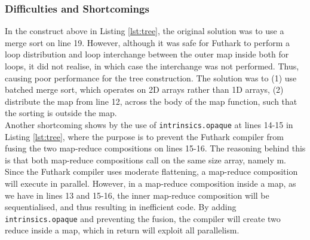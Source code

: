 \subsubsection{Difficulties and Shortcomings}
\label{sec:treediff}
In the construct above in Listing \ref{lst:tree}, the original solution was to use a merge sort on line 19. However, although it was safe for Futhark to perform a loop distribution and loop interchange between the outer map inside both for loops, it did not realise, in which case the interchange was not performed. Thus, causing poor performance for the tree construction.  The solution was to (1) use batched merge sort, which operates on 2D arrays rather than 1D arrays, (2) distribute the map from line 12, across the body of the map function, such that the sorting is outside the map. 
\\[2mm]
Another shortcoming shows by the use of \texttt{intrinsics.opaque} at lines 14-15 in Listing \ref{lst:tree}, where the purpose is to prevent the Futhark compiler from fusing the two map-reduce compositions on lines 15-16. The reasoning behind this is that both map-reduce compositions call on the same size array, namely m. 
\\[2mm]
Since the Futhark compiler uses moderate flattening, a map-reduce composition will execute in parallel. However, in a map-reduce composition inside a map, as we have in lines 13 and 15-16, the inner map-reduce composition will be sequentialised, and thus resulting in inefficient code. By adding \texttt{intrinsics.opaque} and preventing the fusion, the compiler will create two reduce inside a map, which in return will exploit all parallelism. 




















